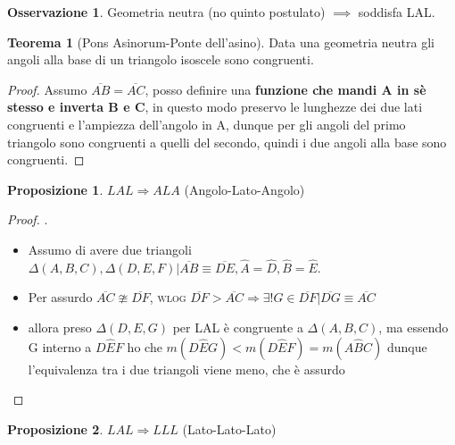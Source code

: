 \documentclass[a4paper,10pt]{article}
\theoremstyle{definition}
\newcommand{\noun}[1]{\textsc{#1}}
\theoremstyle{indentdefinition}
\theoremstyle{indentpostulate}
\theoremstyle{indenttheorem}
\newtheorem{thm}{Teorema}[section]
\newtheorem{prop}{Proposizione}[section]
\theoremstyle{myremark}
\newtheorem*{rem*}{Osservazione}
\theoremstyle{indentgeneral}
\newenvironment{myboxed} 
{\noindent\begin{lrbox}{\mybox}\begin{minipage}{\textwidth}}
{\end{minipage}\end{lrbox}\fbox{\usebox{\mybox}}}
\begin{document}
\begin{myboxed}
\begin{rem*}
   Geometria neutra (no quinto postulato) $\implies$ soddisfa LAL. 
\end{rem*}
\end{myboxed}

\begin{myboxed}
\begin{thm}[Pons Asinorum-Ponte dell'asino] \label{thm-pons-ansiorum}Data una geometria neutra gli angoli alla base di un triangolo isoscele sono congruenti.   \end{thm} 
\end{myboxed}

\begin{proof}    Assumo $\overline{AB}=\overline{AC}$, posso definire una\textbf{ funzione che mandi A in sè stesso e inverta B e C}, in questo modo preservo le lunghezze dei due lati congruenti e l'ampiezza dell'angolo in A, dunque per  gli angoli del primo triangolo sono congruenti a quelli del secondo, quindi i due angoli alla base sono congruenti.  \end{proof} 

\begin{myboxed}
\begin{prop}   $LAL\Rightarrow ALA$ (Angolo-Lato-Angolo)   \end{prop} 
\end{myboxed}

\begin{proof}   .
\begin{itemize}
    \item Assumo di avere due triangoli $\Delta (A,B,C), \Delta (D,E,F)| \overline{AB} \equiv \overline{DE}, \hat{A}=\hat{D}, \hat{B}=\hat{E}$. 
    \item Per assurdo $\overline{AC}\ncong\overline{DF}$, \noun{wlog} $\overline{DF}>\overline{AC} \Rightarrow \exists ! G \in \overline{DF}|\overline{DG} \equiv \overline{AC}$
    \item allora preso $\Delta (D,E,G)$ per LAL è congruente a $\Delta (A,B,C)$, ma essendo G interno a $D\hat{E}F$ ho che $m(D\hat{E}G)<m(D\hat{E}F)=m(A\hat{B}C)$ dunque l'equivalenza tra i due triangoli viene meno, che è assurdo \lightning\end{itemize}  \end{proof} 

\begin{myboxed}
\begin{prop}     $LAL \Rightarrow LLL$ (Lato-Lato-Lato)  \end{prop}
\end{myboxed}
\end{document}
